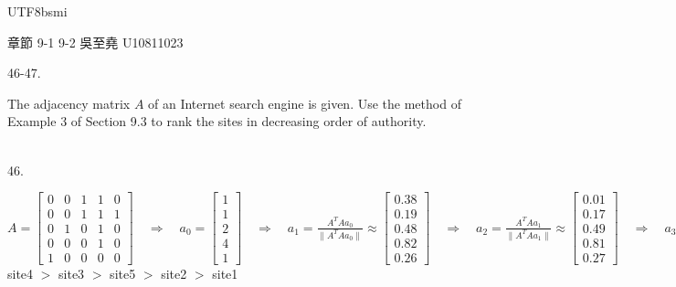 \documentclass[12pt]{book}
\author{andersonwu2000}
\begin{document}
\begin{CJK}{UTF8}{bsmi}

\hfill 章節 9-1 9-2 吳至堯 U10811023


46-47. \begin{minipage}[t]{\dimexpr\linewidth-2em}
The adjacency matrix $A$ of an Internet search engine is given. Use the method of Example 3 of Section 9.3 to rank the sites in decreasing order of authority.
\end{minipage}\\

46. \begin{minipage}[t]{\dimexpr\linewidth-2em}
$\displaystyle A=\begin{bmatrix}
0 & 0 & 1 & 1 & 0 \\
0 & 0 & 1 & 1 & 1 \\
0 & 1 & 0 & 1 & 0 \\
0 & 0 & 0 & 1 & 0 \\
1 & 0 & 0 & 0 & 0
\end{bmatrix}\quad\Rightarrow\quad a_0=\begin{bmatrix}
1 \\ 1 \\ 2 \\ 4 \\ 1
\end{bmatrix}\quad\Rightarrow\quad a_1=\frac{A^TAa_0}{\parallel A^TAa_0\parallel}\approx\begin{bmatrix}
0.38 \\ 0.19 \\ 0.48 \\ 0.82 \\ 0.26
\end{bmatrix}\quad\Rightarrow\quad a_2=\frac{A^TAa_1}{\parallel A^TAa_1\parallel}\approx\begin{bmatrix}
0.01 \\ 0.17 \\ 0.49 \\ 0.81 \\ 0.27
\end{bmatrix}\quad\Rightarrow\quad a_3=\frac{A^TAa_2}{\parallel A^TAa_2\parallel}\approx\begin{bmatrix}
0 \\ 0.17 \\ 0.5 \\ 0.81 \\ 0.27
\end{bmatrix}\quad\Rightarrow\quad$ site4 $>$ site3 $>$ site5 $>$ site2 $>$ site1
\end{minipage}\\


\end{CJK}
\end{document}
